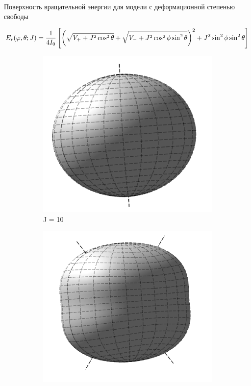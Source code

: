 \documentclass[hyperref={pdfpagelabels=false},usepdftitle=false, xcolor = dvipsnames]{beamer}
\begin{document}
\begin{frame}{Поверхность вращательной энергии для модели с деформационной степенью свободы}
  \begin{varblock}[11cm]{}

	 \scriptsize \begin{gather}
	  E_r (\varphi, \theta; J) = \frac{1}{4I_0} \left[ \left( \sqrt{V_{+} + J^2 \cos^2 \theta} + \sqrt{V_{-} + J^2 \cos^2 \phi \sin^2 \theta} \right)^2 + J^2 \sin^2 \phi \sin^2 \theta \right] \notag
	  \end{gather}
	\vspace*{-0.5cm}
  	  \begin{figure}
  	    \begin{subfigure}{0.3\textwidth}
		  \includegraphics[width=\textwidth]{../pictures/Rigid_RES_10.png}
		  \caption{J = 10}
	    \end{subfigure}
	    \begin{subfigure}{0.3\textwidth}
		  \includegraphics[width=\textwidth]{../pictures/Rigid_RES_30.png}

\end{subfigure}
\end{figure}
\end{varblock}
\end{frame}
\end{document}
